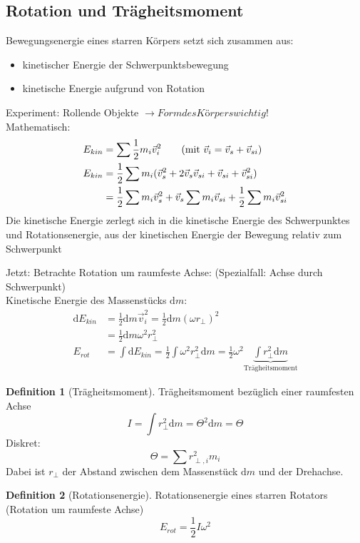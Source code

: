 \documentclass[a4paper]{scrartcl}
\renewcommand{\d}{\mathrm{d}}
\renewcommand{\v}[1]{\vec{#1}}
\theoremstyle{definition}
\newtheorem{defn}{Definition}
\theoremstyle{plain}
\theoremstyle{plain}
\theoremstyle{remark}
\theoremstyle{remark}
\theoremstyle{remark}
\begin{document}
\subsection{Rotation und Trägheitsmoment}
\label{sec-8-4}
Bewegungsenergie eines starren Körpers setzt sich zusammen aus:
\begin{itemize}
\item kinetischer Energie der Schwerpunktsbewegung
\item kinetische Energie aufgrund von Rotation
\end{itemize}
Experiment: Rollende Objekte $\rightarrow Form des Körpers wichtig!$ \\
   Mathematisch:
\begin{align*}
E_{kin} &= \sum \frac{1}{2} m_i \v v_i^2 \tag{mit $\v v_i = \v v_s + \v v_{si}$} \\
E_{kin} &= \frac{1}{2} \sum m_i (\v v_s^2 + 2\v v_s \v v_{si} + \v v_{si} + \v v_{si}^2) \\
&= \frac{1}{2} \sum m_i \v v_s^2 + \v v_s \sum m_i \v v_{si} + \frac{1}{2} \sum m_i \v v_{si}^2 \\
\end{align*}
Die kinetische Energie zerlegt sich in die kinetische Energie des Schwerpunktes und Rotationsenergie, aus der kinetischen Energie der Bewegung relativ zum Schwerpunkt

Jetzt: Betrachte Rotation um raumfeste Achse: (Spezialfall: Achse durch Schwerpunkt) \\
   Kinetische Energie des Massenstücks $\d m$:
\begin{align*}
\d E_{kin} &= \frac{1}{2} \d m \v v_i^2 = \frac{1}{2} \d m (\omega r_{\perp})^2 \\
&= \frac{1}{2} \d m \omega^2 r_\perp^2 \\
E_{rot} &= \int \d E_{kin} = \frac{1}{2} \int \omega^2 r_{\perp}^2 \d m = \frac{1}{2} \omega^2 \underbrace{\int r_\perp^2 \d m}_{\text{Trägheitsmoment}}
\end{align*}


\begin{defn}[Trägheitsmoment]
Trägheitsmoment bezüglich einer raumfesten Achse
\[I = \int r_{\perp}^2 \d m = \Theta^2 \d m = \Theta\]
Diskret:
\[\Theta = \sum r_{\perp,i}^2 m_i\]
Dabei ist $r_\perp$ der Abstand zwischen dem Massenstück $\d m$  und der Drehachse.
\end{defn}
\begin{defn}[Rotationsenergie]
Rotationsenergie eines starren Rotators (Rotation um raumfeste Achse)
\[E_{rot} = \frac{1}{2} I \omega^2\]
\end{defn}
\end{document}
